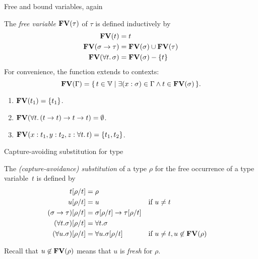 \begin{frame}{Free and bound variables, again}
\begin{definition}
  The \emph{free variable} $\mathbf{FV}(\tau)$ of $\tau$ is defined inductively by
  \begin{align*}
    \mathbf{FV}(t) & {} = t \\
    \mathbf{FV}(\sigma \to \tau) & {} = \mathbf{FV}(\sigma) \cup \mathbf{FV}(\tau) \\
    \mathbf{FV}(\forall t.\, \sigma) & {} = \mathbf{FV}(\sigma) - \{t\}
  \end{align*}
  For convenience, the function extends to contexts:
  \[
    \mathbf{FV}(\Gamma) = \{\, t \in \mathbb{V}\mid \exists (x : \sigma) \in \Gamma
      \wedge t \in \mathbf{FV}(\sigma) \,\}.
  \]
\end{definition}
  \begin{enumerate}
    \item $\mathbf{FV}(t_1) = \{t_1\}$.
    \item $\mathbf{FV}(\forall t.\, (t \to t) \to t \to t) = \emptyset$.
    \item $\mathbf{FV}(x : t_1, y : t_2, z : \forall t.\,t)
      = \{t_1, t_2\}$.
  \end{enumerate}
\end{frame}
\begin{frame}{Capture-avoiding substitution for type}
  \begin{definition}
  The \emph{(capture-avoidance) substitution} of a type $\rho$ for the free
  occurrence of a type variable~$t$ is defined by 
  \begin{align*}
    t[{\rho}/{t}] & = \rho \\
    u[{\rho}/{t}] & = u && \text{if $u \neq t$}\\
    (\sigma\to\tau)[{\rho}/{t}] & =
    \sigma[{\rho}/{t}] \to
    \tau[{\rho}/{t}] \\
    (\forall t.\sigma)[{\rho}/{t}] & = \forall t.\sigma \\
    (\forall u.\sigma)[{\rho}/{t}] & = \forall u.\sigma[{\rho}/{t}]
                                      &&
    \text{if $u \neq t, u \not\in \mathbf{FV}(\rho)$} 
  \end{align*}
  \end{definition}
  Recall that $u \not\in \mathbf{FV}(\rho)$ means that $u$ is \emph{fresh} for $\rho$. 
\end{frame}

